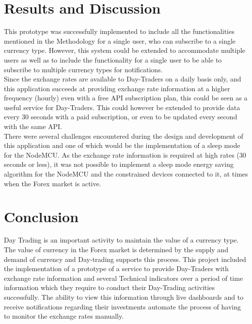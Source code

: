 \section{Results and Discussion}

This prototype was successfully implemented to include all the functionalities mentioned in the Methodology for a single user, who can subscribe to a single currency type. However, this system could be extended to accommodate multiple users as well as to include the functionality for a single user to be able to subscribe to multiple currency types for notifications.\\

Since the exchange rates are available to Day-Traders on a daily basis only, and this application succeeds at providing exchange rate information at a higher frequency (hourly) even with a free API subscription plan, this could be seen as a useful service for Day-Traders. This could however be extended to provide data every 30 seconds with a paid subscription, or even to be updated every second with the same API.\\

There were several challenges encountered during the design and development of this application and one of which would be the implementation of a sleep mode for the NodeMCU. As the exchange rate information is required at high rates (30 seconds or less), it was not possible to implement a sleep mode energy saving algorithm for the NodeMCU and the constrained devices connected to it, at times when the Forex market is active.

\section{Conclusion}

Day Trading is an important activity to maintain the value of a currency type. The value of currency in the Forex market is determined by the supply and demand of currency and Day-trading supports this process. This project included the implementation of a prototype of a service to provide Day-Traders with exchange rate information and several Technical indicators over a period of time information which they require to conduct their Day-Trading activities successfully. The ability to view this information through live dashboards and to receive notifications regarding their investments automate the process of having to monitor the exchange rates manually.
